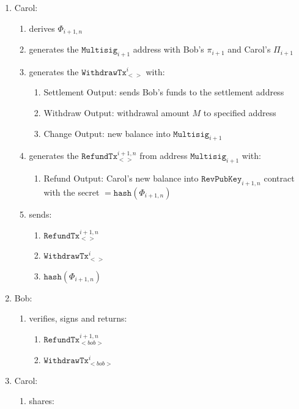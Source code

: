 \documentclass{llncs}
\begin{document}
\begin{enumerate}
\item Carol:
  \begin{enumerate}
  \item derives $\Phi_{i+1,n}$
  \item generates the $\texttt{Multisig}_{i+1}$ address with Bob's $\pi_{i+1}$
and Carol's $\Pi_{i+1}$
  \item generates the $\texttt{WithdrawTx}_{<>}^{i}$ with:
    \begin{enumerate}
    \item Settlement Output: sends Bob's funds to the settlement address
    \item Withdraw Output: withdrawal amount $M$ to specified address
    \item Change Output: new balance into $\texttt{Multisig}_{i+1}$
    \end{enumerate}
  \item generates the $\texttt{RefundTx}_{<>}^{i+1,n}$ from address
$\texttt{Multisig}_{i+1}$ with:
    \begin{enumerate}
    \item Refund Output: Carol's new balance into $\texttt{RevPubKey}_{i+1,n}$
contract with the secret $= \texttt{hash}(\Phi_{i+1,n})$
    \end{enumerate}
  \item sends:
    \begin{enumerate}
    \item $\texttt{RefundTx}_{<>}^{i+1,n}$
    \item $\texttt{WithdrawTx}_{<>}^{i}$
    \item $\texttt{hash}(\Phi_{i+1,n})$
    \end{enumerate}
  \end{enumerate}
\item Bob:
  \begin{enumerate}
  \item verifies, signs and returns:
    \begin{enumerate}
    \item $\texttt{RefundTx}_{<bob>}^{i+1,n}$
    \item $\texttt{WithdrawTx}_{<bob>}^{i}$
    \end{enumerate}
  \end{enumerate}
\item Carol:
  \begin{enumerate}
  \item shares:
    \begin{enumerate}

\end{enumerate}
\end{enumerate}
\end{enumerate}
\end{document}
